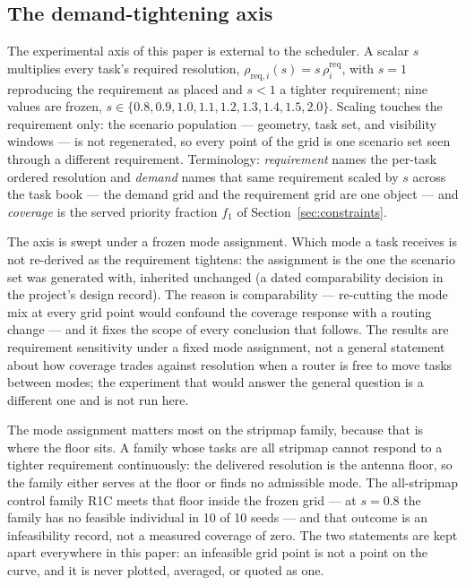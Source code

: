 \documentclass[preprint,authoryear]{elsarticle}
\begin{document}
\subsection{The demand-tightening axis}\label{sec:axis}

The experimental axis of this paper is external to the scheduler. A scalar $s$ multiplies every task's required resolution, $\rho_{\mathrm{req},i}(s)=s\,\rho_{i}^{\mathrm{req}}$, with $s=1$ reproducing the requirement as placed and $s<1$ a tighter requirement; nine values are frozen, $s\in\{0.8,0.9,1.0,1.1,1.2,1.3,1.4,1.5,2.0\}$. Scaling touches the requirement only: the scenario population --- geometry, task set, and visibility windows --- is not regenerated, so every point of the grid is one scenario set seen through a different requirement. Terminology: \emph{requirement} names the per-task ordered resolution and \emph{demand} names that same requirement scaled by $s$ across the task book --- the demand grid and the requirement grid are one object --- and \emph{coverage} is the served priority fraction $f_1$ of Section~\ref{sec:constraints}.

The axis is swept under a frozen mode assignment. Which mode a task receives is not re-derived as the requirement tightens: the assignment is the one the scenario set was generated with, inherited unchanged (a dated comparability decision in the project's design record). The reason is comparability --- re-cutting the mode mix at every grid point would confound the coverage response with a routing change --- and it fixes the scope of every conclusion that follows. The results are requirement sensitivity under a fixed mode assignment, not a general statement about how coverage trades against resolution when a router is free to move tasks between modes; the experiment that would answer the general question is a different one and is not run here.

The mode assignment matters most on the stripmap family, because that is where the floor sits. A family whose tasks are all stripmap cannot respond to a tighter requirement continuously: the delivered resolution is the antenna floor, so the family either serves at the floor or finds no admissible mode. The all-stripmap control family R1C meets that floor inside the frozen grid --- at $s=0.8$ the family has no feasible individual in 10 of 10 seeds --- and that outcome is an infeasibility record, not a measured coverage of zero. The two statements are kept apart everywhere in this paper: an infeasible grid point is not a point on the curve, and it is never plotted, averaged, or quoted as one.
\end{document}
